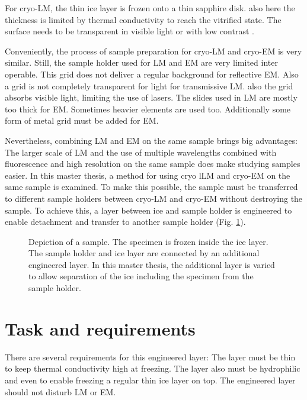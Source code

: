 For cryo-LM, the thin ice layer is frozen onto a thin sapphire disk. also here the thickness is limited by thermal conductivity to reach the vitrified state. The surface needs to be transparent in visible light or with low contrast \cite{Faoro.2018}.

Conveniently, the process of sample preparation for cryo-LM and cryo-EM is very similar. Still, the sample holder used for LM and EM are very limited inter operable. This grid does not deliver a regular background for reflective EM. Also a grid is not completely transparent for light for transmissive LM. also the grid absorbs visible light, limiting the use of lasers. The slides used in LM are mostly too thick for EM. Sometimes heavier elements are used too. Additionally some form of metal grid must be added for EM. 


Nevertheless, combining LM and EM on the same sample brings big advantages: The larger scale of LM and the use of multiple wavelengths combined with fluorescence and high resolution on the same sample does make studying samples easier. In this master thesis, a method for using cryo lLM and cryo-EM on the same sample is examined. To make this possible, the sample must be transferred to different sample holders between cryo-LM and cryo-EM without destroying the sample. To achieve this, a layer between ice and sample holder is engineered to enable detachment and transfer to another sample holder (Fig. \ref{fig:layersingeneral}).

\begin{figure}[hbt!]
	\centering
	
	\caption{Depiction of a sample. The specimen is frozen inside the ice layer. The sample holder and ice layer are connected by an additional engineered layer. In this master thesis, the additional layer is varied to allow separation of the ice including the specimen from the sample holder.}
	\label{fig:layersingeneral}
\end{figure}


\section{Task and requirements}

There are several requirements for this engineered layer: The layer must be thin to keep thermal conductivity high at freezing. The layer also must be hydrophilic and even to  enable freezing a regular thin ice layer on top. The engineered layer should not disturb LM or EM. 

